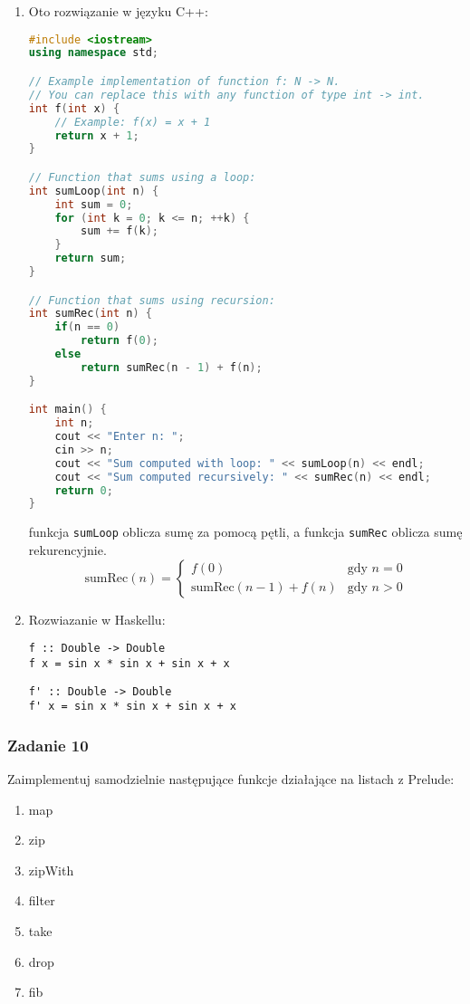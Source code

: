 \documentclass[11pt,a4paper]{article}
\begin{document}
\begin{enumerate}
    \item Oto rozwiązanie w języku C++:
        \begin{lstlisting}[language=C++]
#include <iostream>
using namespace std;

// Example implementation of function f: N -> N.
// You can replace this with any function of type int -> int.
int f(int x) {
    // Example: f(x) = x + 1
    return x + 1;
}

// Function that sums using a loop:
int sumLoop(int n) {
    int sum = 0;
    for (int k = 0; k <= n; ++k) {
        sum += f(k);
    }
    return sum;
}

// Function that sums using recursion:
int sumRec(int n) {
    if(n == 0)
        return f(0);
    else
        return sumRec(n - 1) + f(n);
}

int main() {
    int n;
    cout << "Enter n: ";
    cin >> n;
    cout << "Sum computed with loop: " << sumLoop(n) << endl;
    cout << "Sum computed recursively: " << sumRec(n) << endl;
    return 0;
}
\end{lstlisting}
    funkcja \texttt{sumLoop} oblicza sumę za pomocą pętli, a funkcja \texttt{sumRec} oblicza sumę rekurencyjnie.
    \[
        \text{sumRec}(n) = \left\{
            \begin{array}{ll}
                f(0) & \text{gdy } n = 0 \\
                \text{sumRec}(n-1) + f(n) & \text{gdy } n > 0
            \end{array}
        \right.
    \]
\item Rozwiazanie w Haskellu:
    \begin{Verbatim}[frame=single]
f :: Double -> Double
f x = sin x * sin x + sin x + x
    \end{Verbatim}
    \begin{Verbatim}[frame=single]
f' :: Double -> Double
f' x = sin x * sin x + sin x + x
    \end{Verbatim}
\end{enumerate}

\subsubsection{Zadanie 10} \label{zadanie10}
Zaimplementuj samodzielnie następujące funkcje działające na listach z Prelude:
\begin{enumerate}
    \item map
    \item zip
    \item zipWith
    \item filter
    \item take
    \item drop
    \item fib
\end{enumerate}
\end{document}
